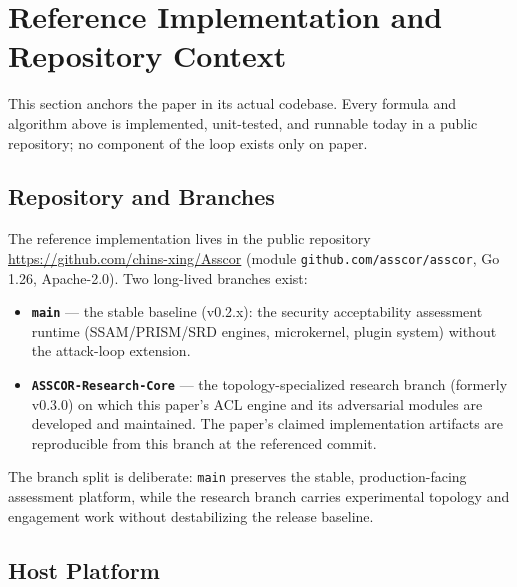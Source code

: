 \documentclass[11pt]{article}
\begin{document}
\section{Reference Implementation and Repository Context}
\label{sec:repo}

This section anchors the paper in its actual codebase. Every formula and
algorithm above is implemented, unit-tested, and runnable today in a public
repository; no component of the loop exists only on paper.

\subsection{Repository and Branches}

The reference implementation lives in the public repository
\url{https://github.com/chins-xing/Asscor} (module
\texttt{github.com/asscor/asscor}, Go 1.26, Apache-2.0). Two long-lived
branches exist:
\begin{itemize}
\item \textbf{\texttt{main}} --- the stable baseline (v0.2.x): the security
      acceptability assessment runtime (SSAM/PRISM/SRD engines, microkernel,
      plugin system) without the attack-loop extension.
\item \textbf{\texttt{ASSCOR-Research-Core}} --- the topology-specialized
      research branch (formerly v0.3.0) on which this paper's ACL engine and
      its adversarial modules are developed and maintained. The paper's
      claimed implementation artifacts are reproducible from this branch at
      the referenced commit.
\end{itemize}
The branch split is deliberate: \texttt{main} preserves the stable,
production-facing assessment platform, while the research branch carries
experimental topology and engagement work without destabilizing the release
baseline.

\subsection{Host Platform}
\end{document}
